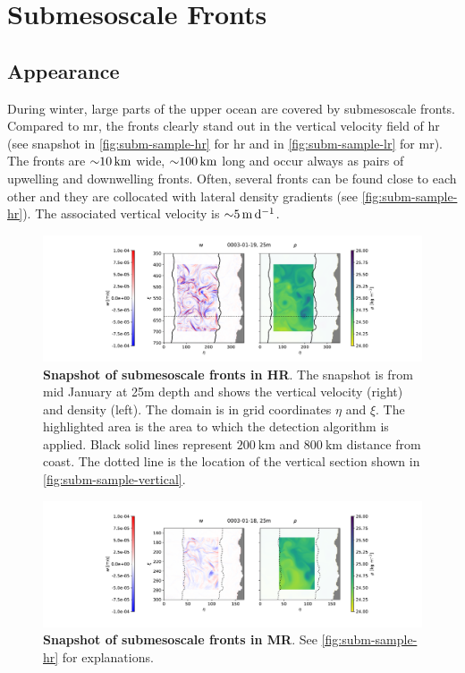 \section{Submesoscale Fronts}\label{sec:subm}

\subsection{Appearance}\label{sec:subm-appearance}

During winter, large parts of the upper ocean are covered by submesoscale fronts. Compared to \ac{mr}, the fronts clearly stand out in the vertical velocity field of \ac{hr} (see snapshot in \autoref{fig:subm-sample-hr} for \ac{hr} and in \autoref{fig:subm-sample-lr} for \ac{mr}). The fronts are ${\sim} \SI{10}{\kilo\metre}$ wide, ${\sim} \SI{100}{\kilo\metre}$ long and occur always as pairs of upwelling and downwelling fronts. Often, several fronts can be found close to each other and they are collocated with lateral density gradients (see \autoref{fig:subm-sample-hr}). The associated vertical velocity is $\around \SI{5}{\metre\per\day}$.\\
\begin{figure}[h]
    \centering
    \hspace*{-0.17cm}\includegraphics[width=17cm, trim=5.2cm 0 0 0]{../figures/result_subm_snapshot-p15}
    \caption[Snapshot of submesoscale fronts in HR]{\textbf{Snapshot of submesoscale fronts in HR}. The snapshot is from mid January at 25m depth and shows the vertical velocity (right) and density (left). The domain is in grid coordinates $\eta$ and $\xi$. The highlighted area is the area to which the detection algorithm is applied. Black solid lines represent $\SI{200}{\kilo\metre}$ and $\SI{800}{\kilo\metre}$ distance from coast. The dotted line is the location of the vertical section shown in \autoref{fig:subm-sample-vertical}.}\label{fig:subm-sample-hr}
\end{figure}
\begin{figure}
    \centering
    \hspace*{-0.17cm}\includegraphics[width=17cm, trim=5.2cm 0 0 0]{../figures/result_subm_snapshot-p30}
    \caption[Snapshot of submesoscale fronts in MR]{\textbf{Snapshot of submesoscale fronts in MR}. See \autoref{fig:subm-sample-hr} for explanations.}\label{fig:subm-sample-lr}
\end{figure}
